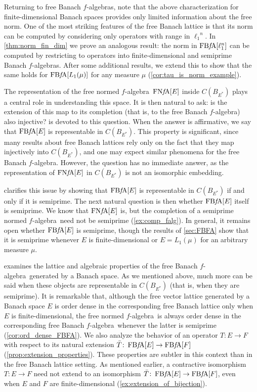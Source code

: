 \documentclass{memo-l}
\theoremstyle{definition}
\theoremstyle{remark}
\numberwithin{section}{chapter}
\numberwithin{equation}{chapter}
\newcommand{\el}[1]{\ensuremath{\ell_{#1}}}
\newcommand{\falg}{$f\!$-algebra}
\newcommand{\FNFA}[1]{\operatorname{FN{\it f}\!A}[#1]}
\newcommand{\FBFA}[1]{\operatorname{FB{\it f}\!A}[#1]}
\begin{document}
Returning to free Banach \falg s, note that the above characterization
for finite-dimensional Banach spaces provides only limited information
about the free norm. One of the most striking features of the free
Banach lattice is that its norm can be computed by considering only
operators with range in $\el 1^{n}$. In \cref{thm:norm_fin_dim} we
prove an analogous result: the norm in $\FBFA{\el 1^{n}}$ can be
computed by restricting to operators into finite-dimensional and semiprime Banach
\falg s. After some additional results, we extend this to show that the
same holds for $\FBFA{L_1(\mu)}$ for any measure $\mu$
(\cref{cor:tau_is_norm_example}).

The representation of the free normed \falg\ $\FNFA E$ inside $C(B_{E^{*}})$ plays a
central role in understanding this space. It is then natural to ask:
is the extension of this map to its completion (that is, to the free
Banach \falg) also injective?  is devoted to
this question. When the answer is affirmative, we say that $\FBFA E$
is representable in $C(B_{E^{*}})$. This property is significant,
since many results about free Banach lattices rely only on the fact
that they map injectively into $C(B_{E^{*}})$, and one may expect similar
phenomena for the free Banach \falg. However, the question has no
immediate answer, as the representation of $\FNFA E$ in $C(B_{E^{*}})$
is not an isomorphic embedding.

 clarifies this issue by showing
that $\FBFA E$ is representable in $C(B_{E^{*}})$ if and only if it is
semiprime. The next natural question is then whether $\FBFA E$ itself
is semiprime. We know that $\FNFA E$ is, but the completion of a
semiprime normed \falg\ need not be semiprime
(\cref{ex:comp_falg}). In general, it remains open whether $\FBFA E$
is semiprime, though the results of \cref{sec:FBFA} show that it is
semiprime whenever $E$ is finite-dimensional or $E=L_1(\mu)$ for an
arbitrary measure $\mu$.

 examines the lattice and algebraic properties of
the free Banach \falg\ generated by a Banach space. As we mentioned above, much
more can be said when these objects are representable in
$C(B_{E^{*}})$ (that is, when they are semiprime). It is remarkable
that, although the free vector lattice generated by a Banach space $E$ is order dense in
the corresponding free Banach lattice only when $E$ is finite-dimensional, the free normed \falg\ is always order dense in the
corresponding free Banach \falg\ whenever the latter is semiprime
(\cref{cor:ord_dense_FBFA}). We also analyze the behavior of an
operator $T\colon E\to F$ with respect to its natural extension
$\bar{T}\colon \FBFA E\to \FBFA F$
(\cref{prop:extension_properties}). These properties are subtler in this context than
in the free Banach lattice setting. As mentioned earlier, a
contractive isomorphism $T\colon E\to F$ need not extend to an
isomorphism $\bar{T}\colon \FBFA E\to \FBFA F$, even when $E$ and $F$
are finite-dimensional (\cref{ex:extension_of_bijection}).
\end{document}
